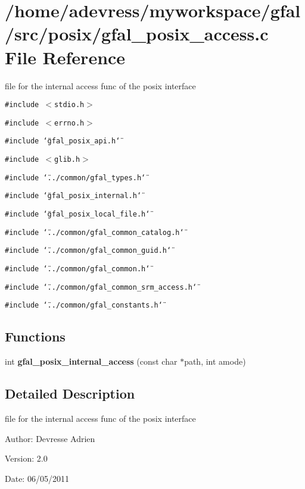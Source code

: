 \section{/home/adevress/myworkspace/gfal/src/posix/gfal\_\-posix\_\-access.c File Reference}
\label{gfal__posix__access_8c}
file for the internal access func of the posix interface 

{\tt \#include $<$stdio.h$>$}\par
{\tt \#include $<$errno.h$>$}\par
{\tt \#include \char`\"{}gfal\_\-posix\_\-api.h\char`\"{}}\par
{\tt \#include $<$glib.h$>$}\par
{\tt \#include \char`\"{}../common/gfal\_\-types.h\char`\"{}}\par
{\tt \#include \char`\"{}gfal\_\-posix\_\-internal.h\char`\"{}}\par
{\tt \#include \char`\"{}gfal\_\-posix\_\-local\_\-file.h\char`\"{}}\par
{\tt \#include \char`\"{}../common/gfal\_\-common\_\-catalog.h\char`\"{}}\par
{\tt \#include \char`\"{}../common/gfal\_\-common\_\-guid.h\char`\"{}}\par
{\tt \#include \char`\"{}../common/gfal\_\-common.h\char`\"{}}\par
{\tt \#include \char`\"{}../common/gfal\_\-common\_\-srm\_\-access.h\char`\"{}}\par
{\tt \#include \char`\"{}../common/gfal\_\-constants.h\char`\"{}}\par
\subsection*{Functions}
\begin{CompactItemize}
\item 
int \textbf{gfal\_\-posix\_\-internal\_\-access} (const char $\ast$path, int amode)\label{gfal__posix__access_8c_4dd88ccfb2942d117604793819e1f933}

\end{CompactItemize}


\subsection{Detailed Description}
file for the internal access func of the posix interface 

\begin{Desc}
\item[Author:]Devresse Adrien \end{Desc}
\begin{Desc}
\item[Version:]2.0 \end{Desc}
\begin{Desc}
\item[Date:]06/05/2011 \end{Desc}
